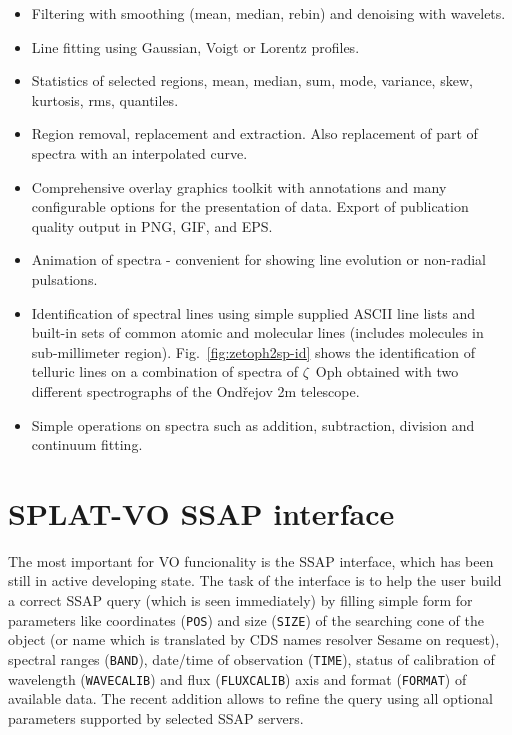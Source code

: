 \documentclass[final,authoryear,5p,times,twocolumn]{elsarticle}
\begin{document}
\begin{itemize}
\item Filtering with smoothing (mean, median, rebin) and denoising with wavelets.

\item Line fitting using Gaussian, Voigt or Lorentz profiles.

\item Statistics of selected regions, mean, median, sum, mode, variance, skew,
      kurtosis, rms, quantiles.

\item Region removal, replacement and extraction. Also replacement of part of
 spectra with an interpolated curve.

\item Comprehensive overlay graphics toolkit with annotations and many
  configurable options for the presentation of data. Export of publication quality
  output in PNG, GIF, and EPS.

\item Animation of spectra - convenient for showing line evolution or
  non-radial pulsations.

\item Identification of spectral lines using simple supplied ASCII line lists
  and built-in sets of common atomic and molecular lines (includes molecules in
  sub-millimeter region). Fig.~\ref{fig:zetoph2sp-id} shows the identification
  of telluric lines on a combination of spectra of $\zeta$~Oph obtained with
  two different spectrographs of the Ond\v{r}ejov 2m telescope.

\item Simple operations on spectra such as addition, subtraction, division and
  continuum fitting.

\end{itemize}


\section{SPLAT-VO SSAP interface}

The most important for VO funcionality is the SSAP interface, which
has been still in active developing state.  The task of the interface
is to help the user build a correct SSAP query (which is seen
immediately) by filling simple form for parameters like coordinates
(\texttt{POS}) and size (\texttt{SIZE}) of the searching cone of the
object (or name which is translated by CDS names resolver Sesame on
request), spectral ranges (\texttt{BAND}), date/time of observation
(\texttt{TIME}), status of calibration of wavelength
(\texttt{WAVECALIB}) and flux (\texttt{FLUXCALIB}) axis and format
(\texttt{FORMAT}) of available data.  The recent addition allows to
refine the query using all optional parameters supported by selected
SSAP servers.
\end{document}
